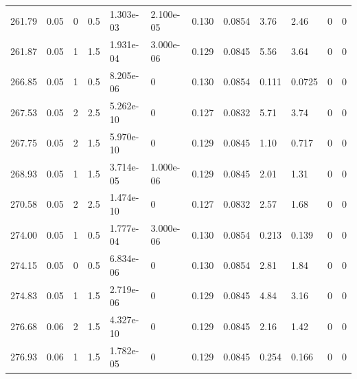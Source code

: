 \documentclass[preview]{standalone}
\begin{document}
{{{{\begin{tabular}{L{1.2cm}C{1.2cm} C{0.3cm}C{0.5cm} C{1.4cm}C{1.4cm} C{1.4cm}C{1.4cm} C{1.6cm}C{1.6cm} C{1.6cm}C{1.6cm}}
  261.79  &  0.05  & 0     & 0.5 &  1.303e-03  & 2.100e-05  &  0.130&   0.0854& 3.76 & 2.46   &  0 & 0  \\ 
  261.87  &  0.05  & 1     & 1.5 &  1.931e-04  & 3.000e-06  &  0.129&   0.0845& 5.56 & 3.64   &  0 & 0  \\ 
  266.85  &  0.05  & 1     & 0.5 &  8.205e-06  & 0  &  0.130&   0.0854& 0.111 & 0.0725   &  0 & 0  \\ 
  267.53  &  0.05  & 2     & 2.5 &  5.262e-10  & 0  &  0.127&   0.0832& 5.71 & 3.74   &  0 & 0  \\ 
  267.75  &  0.05  & 2     & 1.5 &  5.970e-10  & 0  &  0.129&   0.0845& 1.10 & 0.717   &  0 & 0  \\ 
  268.93  &  0.05  & 1     & 1.5 &  3.714e-05  & 1.000e-06  &  0.129&   0.0845& 2.01 & 1.31   &  0 & 0  \\ 
  270.58  &  0.05  & 2     & 2.5 &  1.474e-10  & 0  &  0.127&   0.0832& 2.57 & 1.68   &  0 & 0  \\ 
  274.00  &  0.05  & 1     & 0.5 &  1.777e-04  & 3.000e-06  &  0.130&   0.0854& 0.213 & 0.139   &  0 & 0  \\ 
  274.15  &  0.05  & 0     & 0.5 &  6.834e-06  & 0  &  0.130&   0.0854& 2.81 & 1.84   &  0 & 0  \\ 
  274.83  &  0.05  & 1     & 1.5 &  2.719e-06  & 0  &  0.129&   0.0845& 4.84 & 3.16   &  0 & 0  \\ 
  276.68  &  0.06  & 2     & 1.5 &  4.327e-10  & 0  &  0.129&   0.0845& 2.16 & 1.42   &  0 & 0  \\ 
  276.93  &  0.06  & 1     & 1.5 &  1.782e-05  & 0  &  0.129&   0.0845& 0.254 & 0.166   &  0 & 0  \\ 
\hline 
\end{tabular} 

}}}}
\end{document}
